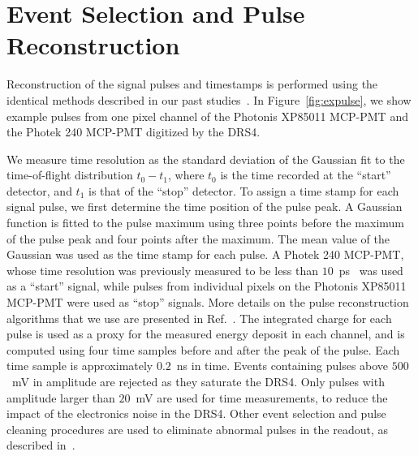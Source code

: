 

\section{Event Selection and Pulse Reconstruction}
\label{sec:reconstruction}
Reconstruction of the signal pulses and timestamps is performed using the
identical methods described in our past
studies~\cite{Anderson:2015gha,MCPFastCaloNIMA,Ronzhin:2015pba}.
In Figure~\ref{fig:expulse}, we show example pulses from one pixel channel of
the Photonis XP85011 MCP-PMT and the Photek 240 MCP-PMT digitized by the DRS4.


We measure time resolution as the standard deviation of the Gaussian fit to the
time-of-flight distribution $t_0-t_1$, where $t_0$ is the time recorded at the
``start'' detector, and $t_1$ is that of the ``stop'' detector. To assign a time
stamp for each signal pulse, we first determine the time position of the pulse
peak. A Gaussian function is fitted to the pulse maximum using three points
before the maximum of the pulse peak and four points after the maximum. The mean
value of the Gaussian was used as the time stamp for each pulse. A Photek 240
MCP-PMT, whose time resolution was previously measured to be less than
$10$~ps~\cite{Ronzhin:2015pba} was used as a ``start'' signal, while pulses from
individual pixels on the Photonis XP85011 MCP-PMT were used as ``stop'' signals.
More details on the pulse reconstruction algorithms that we use are presented in
Ref.~\cite{MCPFastCaloNIMA}. The integrated charge for each pulse is used as a
proxy for the measured energy deposit in each channel, and is computed using
four time samples before and after the peak of the pulse. Each time sample is
approximately $0.2$~ns in time. Events containing pulses above $500$~mV in
amplitude are rejected as they saturate the DRS4. Only pulses with amplitude
larger than $20$~mV are used for time measurements, to reduce the impact of the
electronics noise in the DRS4. Other event selection and pulse cleaning
procedures are used to eliminate abnormal pulses in the readout, as described
in~\cite{MCPFastCaloNIMA}. 

